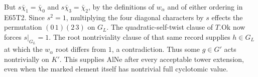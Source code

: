 But $s\bar\chi_1=\bar\chi_0$ and $s\bar\chi_3=\bar\chi_2$,
by the definitions of $w_\alpha$ and of either ordering in E65T2.
Since $s^2=1$, multiplying the four diagonal characters by $s$ effects
the permutation $(0\,1)(2\,3)$ on $G_L$. The quadratic-self-twist
clause of $T.\mathrm{Ok}$ now forces $s|_{G_L}=1$. The root
nontriviality clause of that same record supplies $h\in G_L$ at
which the $w_\alpha$ root differs from $1$, a contradiction.
Thus some $g\in G'$ acts nontrivially on $K'$. This supplies
$\mathrm{AlNe}$ after every acceptable tower extension, even when
the marked element itself has nontrivial full cyclotomic value.
